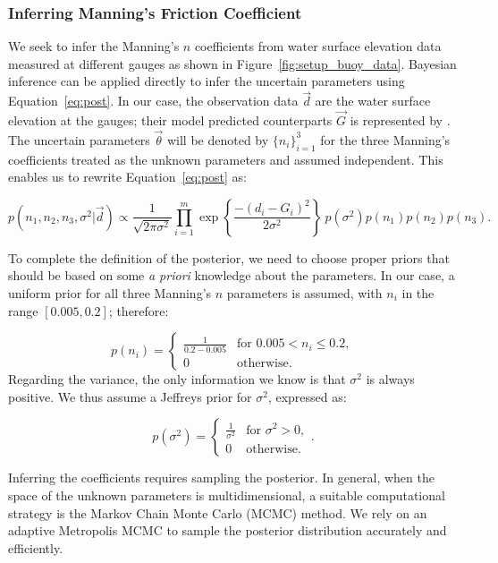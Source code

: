 \subsubsection{Inferring Manning's Friction Coefficient}
\label{sec:infmanning}
 
We seek to infer the Manning's $n$ coefficients from water surface elevation
data measured at different gauges as shown in Figure~\ref{fig:setup_buoy_data}.
Bayesian inference can be applied directly to infer the uncertain parameters
using Equation~\eqref{eq:post}. In our case, the observation data $\vec d$ 
are the water surface elevation at the gauges;
their model predicted counterparts $\vec G$ is represented by \geoclaw.
The uncertain parameters $\vec \theta$ will be denoted by $\{n_i\}_{i=1}^3$ for the
three Manning's coefficients treated as the unknown parameters and assumed independent. 
This enables us to rewrite Equation~\eqref{eq:post} as:

\begin{equation} 
p(n_1,n_2,n_3,\sigma^2 | \vec d) 
\propto \frac{1}{\sqrt{2 \pi \sigma^2}} 
 \prod_{i=1}^m  
\exp \left\lbrace \frac{-(d_i - G_i)^2}{2 \sigma^2} \right\rbrace
\ p(\sigma^2)p(n_1)p(n_2) p(n_3).
\label{eq:post_coef}
\end{equation}

To complete the definition of the posterior, we need to choose proper priors that should be based 
on some \emph{a priori} knowledge about the parameters. In our case, a uniform
prior for all three Manning's $n$ parameters is assumed, with $n_i$ in the range  $[0.005,0.2]$; therefore:

\begin{equation} 
p(n_i) = \begin{cases}
		\displaystyle \frac{1}{0.2-0.005} &\text{for~} 0.005 <  n_i \leq 0.2 ,  \\
		0 &\text{otherwise}.
\end{cases}
\end{equation}
Regarding the variance, the only information we know 
is that $\sigma^2$ is always positive.
We thus assume a Jeffreys prior \citep{sivia} for $\sigma^2$, expressed as:

\begin{equation} 
p(\sigma^2) =  \begin{cases}
		\displaystyle \frac{1}{\sigma^2} &\text{for~} \sigma^2 > 0,  \\
		0 &\text{otherwise}. 
		\end{cases}.
\label{eq:var_pr}
\end{equation}

Inferring the coefficients requires 
sampling the posterior. In general, when the space of the unknown 
parameters is multidimensional, a suitable computational strategy is 
the Markov Chain Monte  Carlo (MCMC) method. 
We rely on an adaptive Metropolis MCMC \citep{Gareth2009,Haario2001} to
sample the posterior distribution accurately and efficiently.


